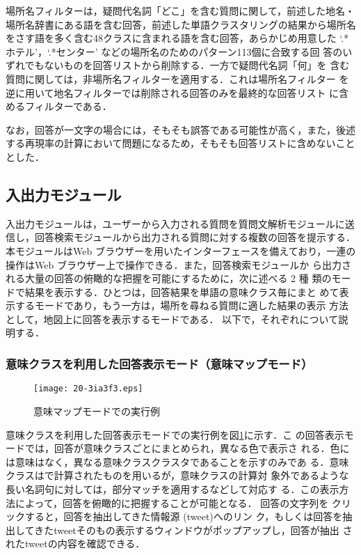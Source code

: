 \documentclass[japanese]{jnlp_1.4}
\begin{document}
場所名フィルターは，疑問代名詞「どこ」を含む質問に関して，前述した地名・
場所名辞書にある語を含む回答，前述した単語クラスタリングの結果から場所名
をさす語を多く含む48クラスに含まれる語を含む回答，あらかじめ用意した
`.*ホテル'，`.*センター' などの場所名のためのパターン113個に合致する回
答のいずれでもないものを回答リストから削除する．一方で疑問代名詞「何」を
含む質問に関しては，非場所名フィルターを適用する．これは場所名フィルター
を逆に用いて地名フィルターでは削除される回答のみを最終的な回答リスト
に含めるフィルターである．

なお，回答が一文字の場合には，そもそも誤答である可能性が高く，また，後述
する再現率の計算において問題になるため，そもそも回答リストに含めないこと
とした．


\subsection{入出力モジュール}
\label{input_output}

入出力モジュールは，ユーザーから入力される質問を質問文解析モジュールに送
信し，回答検索モジュールから出力される質問に対する複数の回答を提示する．
本モジュールはWeb ブラウザーを用いたインターフェースを備えており，一連の
操作はWeb ブラウザー上で操作できる．また，回答検索モジュールか
ら出力される大量の回答の俯瞰的な把握を可能にするために，次に述べる 2 種
類のモードで結果を表示する．ひとつは，回答結果を単語の意味クラス毎にまと
めて表示するモードであり，もう一方は，場所を尋ねる質問に適した結果の表示
方法として，地図上に回答を表示するモードである．
以下で，それぞれについて説明する．


\subsubsection{意味クラスを利用した回答表示モード（意味マップモード）}

\begin{figure}[b]
\begin{center}
\texttt{[image: 20-3ia3f3.eps]}
\end{center}
 \caption{意味マップモードでの実行例} 
\label{sem_map}
\end{figure}

意味クラスを利用した回答表示モードでの実行例を図\ref{sem_map}に示す．こ
の回答表示モードでは，回答が意味クラスごとにまとめられ，異なる色で表示さ
れる．色には意味はなく，異なる意味クラスクラスタであることを示すのみであ
る．意味クラスは\cite{Kazama2008}で計算されたものを用いるが，意味クラスの計算対
象外であるような長い名詞句に対しては，部分マッチを適用するなどして対応す
る．この表示方法によって，回答を俯瞰的に把握することが可能となる．
回答の文字列を
クリックすると，回答を抽出してきた情報源 (tweet)へのリン
ク，もしくは回答を抽出してきたtweetそのもの表示するウィンドウがポップアップし，回答が抽出
されたtweetの内容を確認できる．
\end{document}
